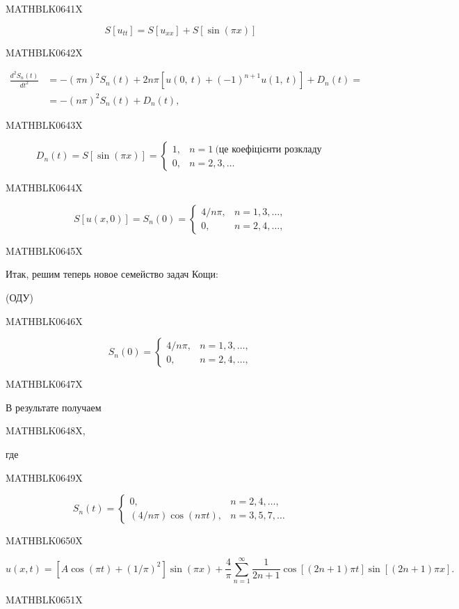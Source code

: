 \documentclass[
  ukrainian,
]{article}
\begin{document}
MATHBLK0641X

\[
S[u_{tt}] = S[u_{xx}] + S[\sin(\pi x)]
\]

MATHBLK0642X

\[
\begin{split} \frac{d^2S_n\left(t\right)}{dt^2} &= -\left(\pi n\right)^2S_n\left(t\right) + 2n\pi\left[u\left(0,\ t\right) + \left(-1\right)^{n+1}u\left(1,\ t\right)\right] + D_n\left(t\right) = \\ &= -\left(n\pi\right)^2S_n\left(t\right) + D_n\left(t\right),  \end{split}
\]

MATHBLK0643X

\[
D_n(t) = S[\sin(\pi x)] = \begin{cases} 1, & n = 1 \ \text{(це коефіцієнти розкладу} \\0, &n = 2, 3, \dots \end{cases}
\]

MATHBLK0644X

\[
S[u(x, 0)] = S_n(0) = \begin{cases} 4/n\pi, & n = 1, 3, \dots, \\ 0, &n = 2, 4, \dots, \end{cases}
\]

MATHBLK0645X

Итак, решим теперь новое семейство задач Кощи:

(ОДУ)

MATHBLK0646X

\[
S_n(0) = \begin{cases}
4/n\pi, & n = 1, 3, \dots, \\
0, & n = 2, 4, \dots,
\end{cases}
\]

MATHBLK0647X

В результате получаем

MATHBLK0648X,

где

MATHBLK0649X

\[
S_n(t) = \begin{cases} 0, &n = 2, 4, \dots, \\ (4/n\pi)\cos(n\pi t), &n = 3, 5, 7, \dots \end{cases}
\]

MATHBLK0650X

\[
u(x, t) = [A\cos(\pi t) + (1/\pi)^2] \sin(\pi x) + \frac{4}{\pi} \sum_{n=1}^{\infty} \frac{1}{2n+1} \cos[(2n+1)\pi t] \sin[(2n+1)\pi x].
\]

MATHBLK0651X
\end{document}
